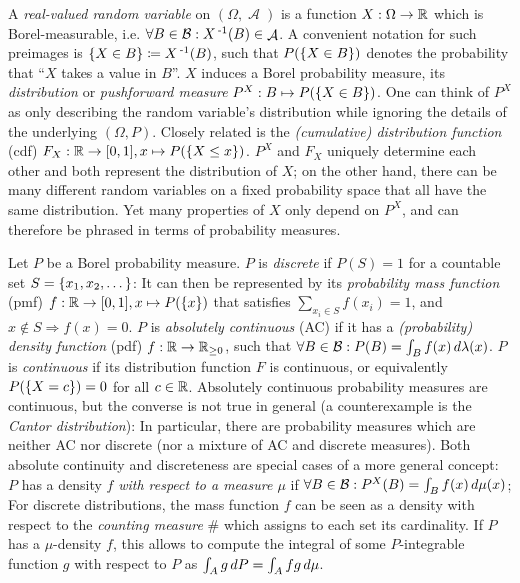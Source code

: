 \documentclass[a4paper,DIV=11]{scrreprt}
\DeclareMathOperator{\A}{\mathcal{A}}
\newcommand{\Rp}{\mathbb{R}_{\geq 0}}
\newcommand{\B}{\mathcal{B}}
\theoremstyle{definition}
\begin{document}
    A \emph{real-valued random variable} on $(\Omega, \A)$ is a function $X: \Omega \to \mathbb{R}$ which is Borel-measurable, i.e. $\forall B \in \B: X\inv(B) \in \A$. 
    A convenient notation for such preimages is $\{X \in B\} \coloneqq X\operatorname{^{-1}}(B)$, such that $P(\{X \in B\})$ denotes the probability that “$X$ takes a value in $B$”.
    $X$ induces a Borel probability measure, its \emph{distribution} or \emph{pushforward measure} $P^X: B \mapsto P(\{X \in B\})$. One can think of $P^X$ as only describing the random variable's distribution while ignoring the details of the underlying $(\Omega, P)$.
    Closely related is the \emph{(cumulative) distribution function} (cdf) $F_X: \mathbb{R} \to [0, 1], x \mapsto P(\{X \leq x\})$.
    $P^X$ and $F_X$ uniquely determine each other and both represent the distribution of $X$; on the other hand, there can be many different random variables on a fixed probability space that all have the same distribution.
    Yet many properties of $X$ only depend on $P^X$, and can therefore be phrased in terms of probability measures.
    \cite[Sections 14, 20]{bib:billingsleyProbabilityAndMeasure}
    
    Let $P$ be a Borel probability measure.
    $P$ is \emph{discrete} if $P(S) = 1$ for a countable set $S = \{x_1, x_2, \dots\}$: It can then be represented by its \emph{probability mass function} (pmf) $f: \mathbb{R} \to [0, 1], x \mapsto P(\{x\})$ that satisfies $\sum_{x_i \in S} f(x_i) = 1$, and $x \notin S \Rightarrow f(x) = 0$.
    $P$ is \emph{absolutely continuous} (AC) if it has a \emph{(probability) density function} (pdf) $f: \R \to \Rp$, such that $\forall B \in \B: P(B) = \lintegral{B}{f(x)}{\lambda(x)}$.
    $P$ is \emph{continuous} if its distribution function $F$ is continuous, or equivalently $P(\{X = c\}) = 0$ for all $c \in \mathbb{R}$.
    Absolutely continuous probability measures are continuous, but the converse is not true in general (a counterexample is the \emph{Cantor distribution}): In particular, there are probability measures which are neither AC nor discrete (nor a mixture of AC and discrete measures).
    Both absolute continuity and discreteness are special cases of a more general concept: $P$ has a density $f$ \emph{with respect to a measure $\mu$} if $\forall B \in \B: P^X(B) = \lintegral{B}{f(x)}{\mu(x)}$; For discrete distributions, the mass function $f$ can be seen as a density with respect to the \emph{counting measure} $\#$ which assigns to each set its cardinality.
    If $P$ has a $\mu$-density $f$, this allows to compute the integral of some $P$-integrable function $g$ with respect to $P$ as $\int_{A} g \, dP = \int_{A} f g \, d\mu$. 
    \cite[Sections 16, 20, 31]{bib:billingsleyProbabilityAndMeasure}
    
\end{document}
